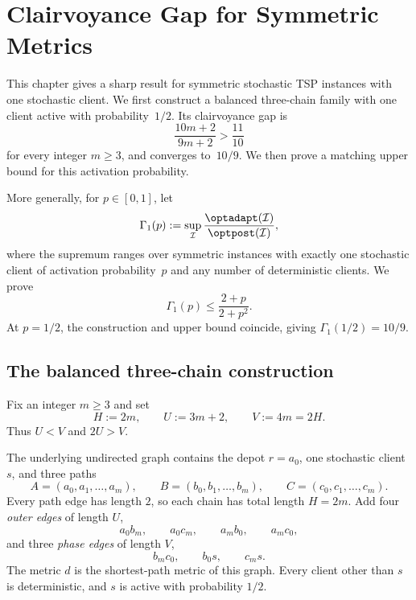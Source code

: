 \chapter{Clairvoyance Gap for Symmetric Metrics}\label{ch:sym-clair}

\providecommand{\Gammaone}{\Gamma_{1}}

This chapter gives a sharp result for symmetric stochastic TSP instances with
one stochastic client.  We first construct a balanced three-chain family
with one client active with probability~$1/2$.  Its clairvoyance gap is
\[
  \frac{10m+2}{9m+2}>\frac{11}{10}
\]
for every integer $m\ge3$, and converges to~$10/9$.  We then prove a matching
upper bound for this activation probability.

More generally, for $p\in[0,1]$, let
\[
  \Gammaone(p)
  :=\sup_{\mathcal I}
  \frac{\optadapt(\mathcal I)}{\optpost(\mathcal I)},
\]
where the supremum ranges over symmetric instances with exactly one
stochastic client of activation probability~$p$ and any number of
deterministic clients.  We prove
\[
  \Gammaone(p)\le\frac{2+p}{2+p^2}.
\]
At $p=1/2$, the construction and upper bound coincide, giving
$\Gammaone(1/2)=10/9$.

\section{The balanced three-chain construction}

Fix an integer $m\ge3$ and set
\begin{equation}\label{eq:HUV}
  H:=2m,
  \qquad
  U:=3m+2,
  \qquad
  V:=4m=2H.
\end{equation}
Thus $U<V$ and $2U>V$.

\begin{construction}\label{con:three-chain}
The underlying undirected graph contains the depot $r=a_0$, one
stochastic client $s$, and three paths
\[
  A=(a_0,a_1,\ldots,a_m),
  \qquad
  B=(b_0,b_1,\ldots,b_m),
  \qquad
  C=(c_0,c_1,\ldots,c_m).
\]
Every path edge has length $2$, so each chain has total length $H=2m$.
Add four \emph{outer edges} of length $U$,
\begin{equation}\label{eq:outer-edges}
  a_0b_m,
  \qquad
  a_0c_m,
  \qquad
  a_mb_0,
  \qquad
  a_mc_0,
\end{equation}
and three \emph{phase edges} of length $V$,
\begin{equation}\label{eq:phase-edges}
  b_mc_0,
  \qquad
  b_0s,
  \qquad
  c_ms.
\end{equation}
The metric $d$ is the shortest-path metric of this graph.  Every
client other than $s$ is deterministic, and $s$ is active with probability
$1/2$.
\end{construction}

